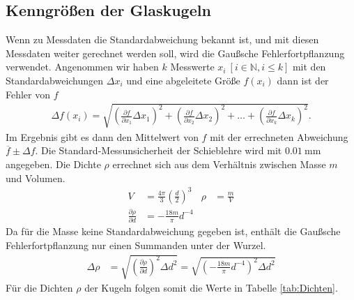 \subsection{Kenngrößen der Glaskugeln}



Wenn zu Messdaten die Standardabweichung bekannt ist, und mit diesen Messdaten weiter gerechnet werden soll,
wird die Gaußsche Fehlerfortpflanzung verwendet. 
Angenommen wir haben $k$ Messwerte $x_i ~[i \in \mathbb{N}, i \leq k]$ mit den Standardabweichungen $\Delta x_i$
und eine abgeleitete Größe $f(x_i)$ dann ist der Fehler von $f$
\begin{align}
    \Delta f(x_i) = \sqrt{
    \left(\frac{\partial f}{\partial x_1} \Delta x_1\right)^2%
     + \left(\frac{\partial f}{\partial x_2} \Delta x_2\right)^2%
     + \dots%
     + \left(\frac{\partial f}{\partial x_k} \Delta x_k\right)^2%
    }.
    \label{eq:gauspflanz}
\end{align} 
Im Ergebnis gibt es dann den Mittelwert von $f$ mit der errechneten Abweichung $\overline{f} \pm \Delta f $.
Die Standard-Messunsicherheit der Schieblehre wird mit $\qty{0.01}{\mm}$ angegeben.
Die Dichte $\rho$ errechnet sich aus dem Verhältnis zwischen Masse $m$ und Volumen.
\begin{align*}
    V &= \frac{4 \pi}{3} \left(\frac{d}{2}\right)^3 & \rho &= \frac{m}{V} \\
    \frac{\partial \rho}{\partial d} &= -\frac{18 m}{\pi} d^{-4} %
\end{align*}
%
Da für die Masse keine Standardabweichung gegeben ist, enthält die Gaußsche Fehlerfortpflanzung nur einen Summanden unter der Wurzel.
\begin{align*}
    \Delta \rho &= \sqrt{\left(\frac{\partial \rho}{\partial d} \right)^{2} \Delta d^{2} }%
    =\sqrt{\left(-\frac{18 m}{\pi} d^{-4} \right)^{2} \Delta d^{2} }%
\end{align*}%
Für die Dichten $\rho$ der Kugeln folgen somit die Werte in Tabelle \ref{tab:Dichten}.



